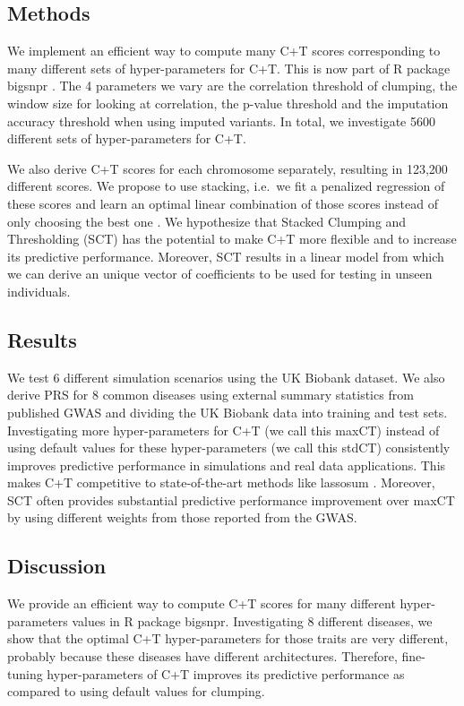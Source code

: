 \subsection{Methods}

We implement an efficient way to compute many C+T scores corresponding to many different sets of hyper-parameters for C+T. This is now part of R package bigsnpr \cite[]{prive2018efficient}. 
The 4 parameters we vary are the correlation threshold of clumping, the window size for looking at correlation, the p-value threshold and the imputation accuracy threshold when using imputed variants.
In total, we investigate 5600 different sets of hyper-parameters for C+T.

We also derive C+T scores for each chromosome separately, resulting in 123,200 different scores.
We propose to use stacking, i.e.\ we fit a penalized regression of these scores and learn an optimal linear combination of those scores instead of only choosing the best one \cite[]{breiman1996stacked}.
We hypothesize that Stacked Clumping and Thresholding (SCT) has the potential to make C+T more flexible and to increase its predictive performance.
Moreover, SCT results in a linear model from which we can derive an unique vector of coefficients to be used for testing in unseen individuals.

\subsection{Results}

We test 6 different simulation scenarios using the UK Biobank dataset. We also derive PRS for 8 common diseases using external summary statistics from published GWAS and dividing the UK Biobank data into training and test sets.
Investigating more hyper-parameters for C+T (we call this maxCT) instead of using default values for these hyper-parameters (we call this stdCT) consistently improves predictive performance in simulations and real data applications.
This makes C+T competitive to state-of-the-art methods like lassosum \cite[]{mak2017polygenic}.
Moreover, SCT often provides substantial predictive performance improvement over maxCT by using different weights from those reported from the GWAS.

\subsection{Discussion}

We provide an efficient way to compute C+T scores for many different hyper-parameters values in R package bigsnpr.
Investigating 8 different diseases, we show that the optimal C+T hyper-parameters for those traits are very different, probably because these diseases have different architectures.
Therefore, fine-tuning hyper-parameters of C+T improves its predictive performance as compared to using default values for clumping. 

